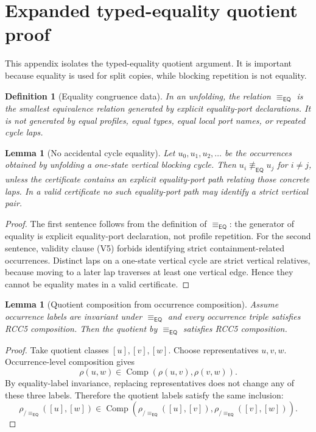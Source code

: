 \documentclass[11pt]{article}
\newtheorem{lemma}[theorem]{Lemma}
\newtheorem{definition}[theorem]{Definition}
\newcommand{\EQ}{\mathsf{EQ}}
\newcommand{\comp}{\operatorname{Comp}}
\newcommand{\eqc}{\equiv_{\EQ}}
\begin{document}
\section{Expanded typed-equality quotient proof}

This appendix isolates the typed-equality quotient argument.  It is important because equality is used for split copies, while blocking repetition is not equality.

\begin{definition}[Equality congruence data]
In an unfolding, the relation $\eqc$ is the smallest equivalence relation generated by explicit equality-port declarations.  It is not generated by equal profiles, equal types, equal local port names, or repeated cycle laps.
\end{definition}

\begin{lemma}[No accidental cycle equality]
Let $u_0,u_1,u_2,\ldots$ be the occurrences obtained by unfolding a one-state vertical blocking cycle.  Then $u_i\not\eqc u_j$ for $i\ne j$, unless the certificate contains an explicit equality-port path relating those concrete laps.  In a valid certificate no such equality-port path may identify a strict vertical pair.
\end{lemma}

\begin{proof}
The first sentence follows from the definition of $\eqc$: the generator of equality is explicit equality-port declaration, not profile repetition.  For the second sentence, validity clause (V5) forbids identifying strict containment-related occurrences.  Distinct laps on a one-state vertical cycle are strict vertical relatives, because moving to a later lap traverses at least one vertical edge.  Hence they cannot be equality mates in a valid certificate.
\end{proof}

\begin{lemma}[Quotient composition from occurrence composition]
Assume occurrence labels are invariant under $\eqc$ and every occurrence triple satisfies RCC5 composition.  Then the quotient by $\eqc$ satisfies RCC5 composition.
\end{lemma}

\begin{proof}
Take quotient classes $[u],[v],[w]$.  Choose representatives $u,v,w$.  Occurrence-level composition gives
\[
  \rho(u,w)\in\comp(\rho(u,v),\rho(v,w)).
\]
By equality-label invariance, replacing representatives does not change any of these three labels.  Therefore the quotient labels satisfy the same inclusion:
\[
  \rho_{/\eqc}([u],[w])\in
  \comp(\rho_{/\eqc}([u],[v]),\rho_{/\eqc}([v],[w])).
\]
\end{proof}
\end{document}
